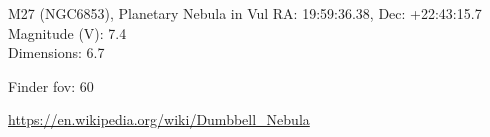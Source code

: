 \begin{block}{M27 (NGC6853), Planetary Nebula in Vul}
    RA: 19:59:36.38, Dec: +22:43:15.7 \\ 
    Magnitude (V): 7.4 \\ 
    Dimensions: 6.7 

    Finder fov: 60 

    \url{https://en.wikipedia.org/wiki/Dumbbell_Nebula} 
\end{block}